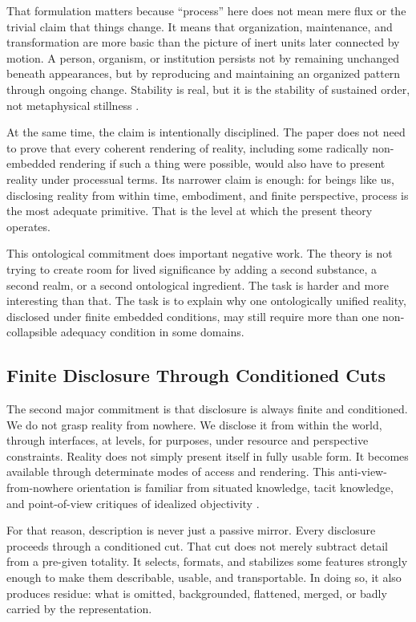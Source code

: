 \documentclass[11pt]{article}
\begin{document}
That formulation matters because ``process'' here does not mean mere flux or the trivial claim that things change. It means that organization, maintenance, and transformation are more basic than the picture of inert units later connected by motion. A person, organism, or institution persists not by remaining unchanged beneath appearances, but by reproducing and maintaining an organized pattern through ongoing change. Stability is real, but it is the stability of sustained order, not metaphysical stillness \cite{Whitehead1978,Rescher1996,TognoliKelso2014}.

At the same time, the claim is intentionally disciplined. The paper does not need to prove that every coherent rendering of reality, including some radically non-embedded rendering if such a thing were possible, would also have to present reality under processual terms. Its narrower claim is enough: for beings like us, disclosing reality from within time, embodiment, and finite perspective, process is the most adequate primitive. That is the level at which the present theory operates.

This ontological commitment does important negative work. The theory is not trying to create room for lived significance by adding a second substance, a second realm, or a second ontological ingredient. The task is harder and more interesting than that. The task is to explain why one ontologically unified reality, disclosed under finite embedded conditions, may still require more than one non-collapsible adequacy condition in some domains.

\subsection{Finite Disclosure Through Conditioned Cuts}

The second major commitment is that disclosure is always finite and conditioned. We do not grasp reality from nowhere. We disclose it from within the world, through interfaces, at levels, for purposes, under resource and perspective constraints. Reality does not simply present itself in fully usable form. It becomes available through determinate modes of access and rendering. This anti-view-from-nowhere orientation is familiar from situated knowledge, tacit knowledge, and point-of-view critiques of idealized objectivity \cite{Haraway1988,Polanyi1958,Nagel1986}.

For that reason, description is never just a passive mirror. Every disclosure proceeds through a conditioned cut. That cut does not merely subtract detail from a pre-given totality. It selects, formats, and stabilizes some features strongly enough to make them describable, usable, and transportable. In doing so, it also produces residue: what is omitted, backgrounded, flattened, merged, or badly carried by the representation.
\end{document}
